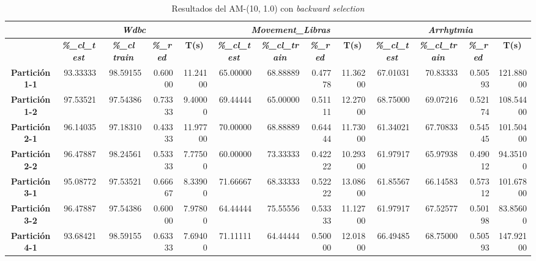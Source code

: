 \documentclass[a4paper,11pt]{article}
\begin{document}
  
  \begin{table}[H]
  \caption{Resultados del AM-(10, 1.0) con \textit{backward selection}}
  \begin{adjustbox}{width=1.1\textwidth}
  \begin{tabular}{|c|r|r|r|r|r|r|r|r|r|r|r|r|}
  \hline
  \multicolumn{1}{|l|}{} & \multicolumn{ 4}{c|}{\textbf{\textit{Wdbc}}} & \multicolumn{ 4}{c|}{\textbf{\textit{Movement\_Libras}}} & \multicolumn{ 4}{c|}{\textbf{\textit{Arrhytmia}}} \\ \hline
  \multicolumn{1}{|l|}{} & \multicolumn{1}{c|}{\textbf{\textit{\%\_cl\_test}}} & \multicolumn{1}{c|}{\textbf{\textit{\%\_cl train}}} & \multicolumn{1}{c|}{\textbf{\textit{\%\_red}}} & \multicolumn{1}{c|}{\textbf{T(s)}} & \multicolumn{1}{c|}{\textbf{\textit{\%\_cl\_test}}} & \multicolumn{1}{c|}{\textbf{\textit{\%\_cl\_train}}} & \multicolumn{1}{c|}{\textbf{\textit{\%\_red}}} & \multicolumn{1}{c|}{\textbf{T(s)}} & \multicolumn{1}{c|}{\textbf{\textit{\%\_cl\_test}}} & \multicolumn{1}{c|}{\textbf{\textit{\%\_cl\_train}}} & \multicolumn{1}{c|}{\textbf{\textit{\%\_red}}} & \multicolumn{1}{c|}{\textbf{T(s)}} \\ \hline
  \textbf{Partición 1-1} & 93.33333 & 98.59155 & 0.60000 & 11.24100 & 65.00000 & 68.88889 & 0.47778 & 11.36200 & 67.01031 & 70.83333 & 0.50593 & 121.88000 \\ \hline
  \textbf{Partición 1-2} & 97.53521 & 97.54386 & 0.73333 & 9.40000 & 69.44444 & 65.00000 & 0.51111 & 12.27000 & 68.75000 & 69.07216 & 0.52174 & 108.54400 \\ \hline
  \textbf{Partición 2-1} & 96.14035 & 97.18310 & 0.43333 & 11.97700 & 70.00000 & 68.88889 & 0.64444 & 11.73000 & 61.34021 & 67.70833 & 0.54545 & 101.50400 \\ \hline
  \textbf{Partición 2-2} & 96.47887 & 98.24561 & 0.53333 & 7.77500 & 60.00000 & 73.33333 & 0.42222 & 10.29300 & 61.97917 & 65.97938 & 0.49012 & 94.35100 \\ \hline
  \textbf{Partición 3-1} & 95.08772 & 97.53521 & 0.66667 & 8.33900 & 71.66667 & 68.33333 & 0.52222 & 13.08600 & 61.85567 & 66.14583 & 0.57312 & 101.67800 \\ \hline
  \textbf{Partición 3-2} & 96.47887 & 97.54386 & 0.60000 & 7.97800 & 64.44444 & 75.55556 & 0.53333 & 11.12700 & 61.97917 & 67.52577 & 0.50198 & 83.85600 \\ \hline
  \textbf{Partición 4-1} & 93.68421 & 98.59155 & 0.63333 & 7.69400 & 71.11111 & 64.44444 & 0.50000 & 12.01800 & 66.49485 & 68.75000 & 0.50593 & 147.92100 \\ \hline

\end{tabular}
\end{adjustbox}
\end{table}
\end{document}
